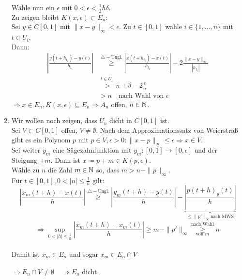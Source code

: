 \begin{beweis}
\begin{enumerate}[label=\roman*\upshape)]
			Wähle nun ein $\epsilon$ mit $0 < \epsilon < \frac{1}{2} h \delta$. \\
			Zu zeigen bleibt $K(x, \epsilon) \subset E_{n}$: \\
			Sei $y \in C[0, 1]$ mit $\| x - y \|_{\infty} < \epsilon$. Zu $t \in [0, 1]$ wähle $i \in \{ 1, \dotsc, n \}$ mit $t \in U_{i}$. \\
			Dann:
			\begin{align*}
				\left| \frac{y(t + h_{t_{i}}) - y(t)}{h_{t_{i}}} \right| & \overset{\triangle-\text{Ungl.}}{\geq} \left| \frac{x(t + h_{t_{i}}) - x(t)}{h_{t_{i}}} \right| - 2 \frac{\| x - y \|_{\infty}}{|h_{t_{i}}|} \\
				& \overset{t \in U_{t_{i}}}{>} n + \delta - 2 \frac{\epsilon}{n} \\
				& > n \quad \text{nach Wahl von } \epsilon
			\end{align*}
			$\Rightarrow x \in E_{n}, K(x, \epsilon) \subseteq E_{n} \Rightarrow A_{n}$ offen, $n \in \mathbb{N}$.
		\item Wir wollen noch zeigen, dass $U_{n}$ dicht in $C[0, 1]$ ist. \\
			Sei $V \subset C[0, 1]$ offen, $V \neq \emptyset$. Nach dem Approximationssatz von Weierstra{\ss} gibt es ein Polynom $p$ mit $p \in V, \epsilon > 0: \| x - p \|_{\infty} \leq \epsilon \Rightarrow x \in V$. \\
			Sei weiter $y_{m}$ eine Sägezahnfunktion mit $y_{m}: [0, 1] \rightarrow [0, \epsilon]$ und der Steigung $\pm m$.
			Dann ist $x \coloneqq p + {m} \in K(p, \epsilon)$. \\
			Wähle zu $n$ die Zahl $m \in \mathbb{N}$ so, dass $m > n + \| p \|_{\infty}$. \\
			Für $t \in [0, 1], 0 < | n | \leq \frac{1}{n}$ gilt:
			\[ \left| \frac{x_{m}(t + h) - x(t)}{h} \right| \overset{\triangle-\text{Ungl.}}{\geq} \left| \frac{y_{m}(t + h) - y(t)}{h} \right| - \underbrace{\left| \frac{p(t + h) _ p(t)}{h} \right|}_{\leq{\| p' \|_{\infty}} \text{nach MWS}}  \]
			\[ \Rightarrow \sup_{0 < |h| \leq \frac{1}{n}} \left| \frac{x_{m}(t + h) - x_{m}(t)}{h} \right| \geq m - \| p' \|_{\infty} \overset{\text{nach Wahl}}{\underset{\text{von }m}{\geq}} n \] \\
			Damit ist $x_{m} \in E_{n}$ und sogar $x_{m} \in E_{n} \cap V$ \\ \\
			$\Rightarrow E_{n} \cap V \neq \emptyset \quad \Rightarrow E_{n} \text{ dicht.}$
	\end{enumerate}	
\end{beweis}



